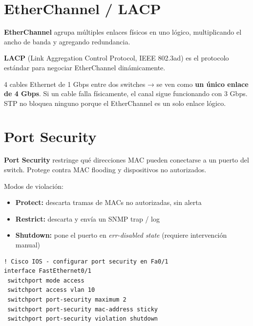 \section{ EtherChannel / LACP}

\begin{concepto}
\textbf{EtherChannel} agrupa múltiples enlaces físicos en uno lógico,
multiplicando el ancho de banda y agregando redundancia.

\textbf{LACP} (Link Aggregation Control Protocol, IEEE 802.3ad) es el protocolo
estándar para negociar EtherChannel dinámicamente.
\end{concepto}

\begin{ejemplo}
4 cables Ethernet de 1 Gbps entre dos switches → se ven como
\textbf{un único enlace de 4 Gbps}. Si un cable falla físicamente,
el canal sigue funcionando con 3 Gbps. STP no bloquea ninguno porque
el EtherChannel es un solo enlace lógico.
\end{ejemplo}

\section{ Port Security}

\begin{concepto}
\textbf{Port Security} restringe qué direcciones MAC pueden conectarse a un
puerto del switch. Protege contra MAC flooding y dispositivos no autorizados.
\end{concepto}

Modos de violación:
\begin{itemize}
    \item \textbf{Protect:} descarta tramas de MACs no autorizadas, sin alerta
    \item \textbf{Restrict:} descarta y envía un SNMP trap / log
    \item \textbf{Shutdown:} pone el puerto en \textit{err-disabled state} (requiere intervención manual)
\end{itemize}

\begin{codigo}
\begin{lstlisting}
! Cisco IOS - configurar port security en Fa0/1
interface FastEthernet0/1
 switchport mode access
 switchport access vlan 10
 switchport port-security maximum 2
 switchport port-security mac-address sticky
 switchport port-security violation shutdown
\end{lstlisting}
\end{codigo}
